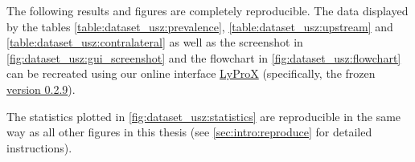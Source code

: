 \begin{tcolorbox}[title=\faIcon{recycle} Reproducibility, parbox=false]
    The following results and figures are completely reproducible. The data displayed by the tables \cref{table:dataset_usz:prevalence}, \cref{table:dataset_usz:upstream} and \cref{table:dataset_usz:contralateral} as well as the screenshot in \cref{fig:dataset_usz:gui_screenshot} and the flowchart in \cref{fig:dataset_usz:flowchart} can be recreated using our online interface \href{https://lyprox.org}{ LyProX} (specifically, the frozen \href{https://2021-oropharynx.lyprox.org}{ version 0.2.9}).
    
    The statistics plotted in \cref{fig:dataset_usz:statistics} are reproducible in the same way as all other figures in this thesis (see \cref{sec:intro:reproduce} for detailed instructions).
\end{tcolorbox}
